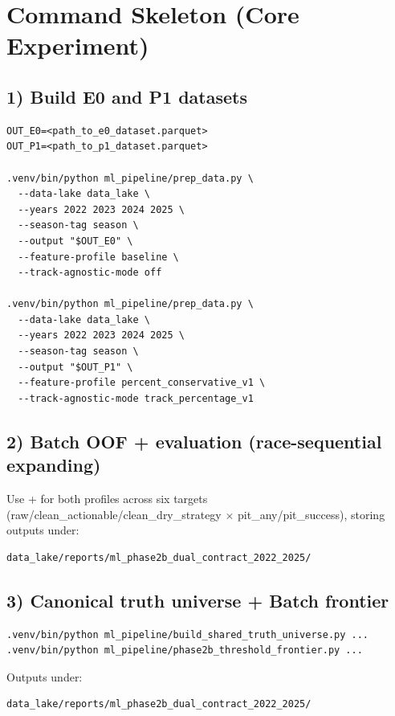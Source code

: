 \section{Command Skeleton (Core Experiment)}

\subsection{1) Build E0 and P1 datasets}

\begin{verbatim}
OUT_E0=<path_to_e0_dataset.parquet>
OUT_P1=<path_to_p1_dataset.parquet>

.venv/bin/python ml_pipeline/prep_data.py \
  --data-lake data_lake \
  --years 2022 2023 2024 2025 \
  --season-tag season \
  --output "$OUT_E0" \
  --feature-profile baseline \
  --track-agnostic-mode off

.venv/bin/python ml_pipeline/prep_data.py \
  --data-lake data_lake \
  --years 2022 2023 2024 2025 \
  --season-tag season \
  --output "$OUT_P1" \
  --feature-profile percent_conservative_v1 \
  --track-agnostic-mode track_percentage_v1
\end{verbatim}

\subsection{2) Batch OOF + evaluation (race-sequential expanding)}

Use  +
for both profiles across six targets (raw/clean\_actionable/clean\_dry\_strategy $\times$ pit\_any/pit\_success), storing outputs under:
\begin{verbatim}
data_lake/reports/ml_phase2b_dual_contract_2022_2025/
\end{verbatim}

\subsection{3) Canonical truth universe + Batch frontier}

\begin{verbatim}
.venv/bin/python ml_pipeline/build_shared_truth_universe.py ...
.venv/bin/python ml_pipeline/phase2b_threshold_frontier.py ...
\end{verbatim}

Outputs under:
\begin{verbatim}
data_lake/reports/ml_phase2b_dual_contract_2022_2025/
\end{verbatim}


